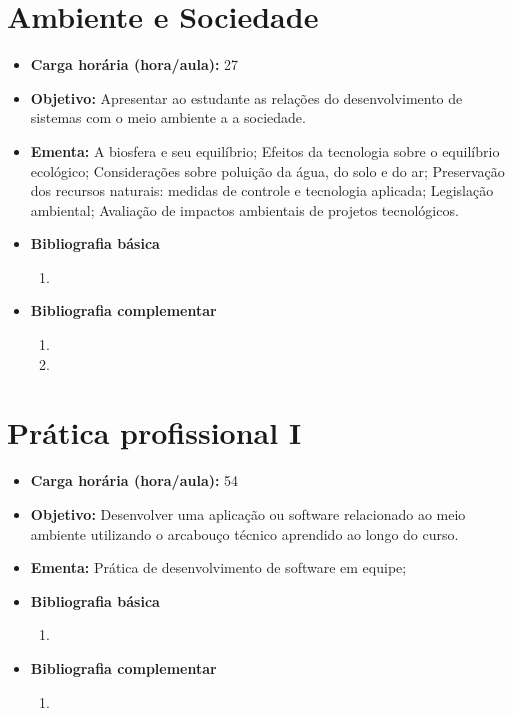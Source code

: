 \documentclass[
	10pt,				%
	openright,			%
	twoside,			%
	a4paper,			%
	english,			%
	french,				%
	brazil,				%
	sumario=tradicional
]{abntex2}
\begin{document}
\section*{Ambiente e Sociedade}\label{3_educamb}
\begin{itemize}
	\item \textbf{Carga horária (hora/aula):} 27
	\item \textbf{Objetivo:} Apresentar ao estudante as relações do desenvolvimento de sistemas com o meio ambiente a a sociedade.
	\item \textbf{Ementa:} 
	A biosfera e seu equilíbrio;
	Efeitos da tecnologia sobre o equilíbrio ecológico;
	Considerações sobre poluição da água, do solo e do ar;
	Preservação dos recursos naturais: medidas de controle e tecnologia aplicada;
	Legislação ambiental;
	Avaliação de impactos ambientais de projetos tecnológicos.
	\item \textbf{Bibliografia básica}
	\begin{enumerate}
		\item 
	\end{enumerate}
	\item \textbf{Bibliografia complementar}
	\begin{enumerate}
		\item
		\item 
	\end{enumerate}
\end{itemize}


\newpage
\section*{Prática profissional I}\label{3_projamb}
\begin{itemize}
	\item \textbf{Carga horária (hora/aula):} 54
	\item \textbf{Objetivo:} Desenvolver uma aplicação ou software relacionado ao meio ambiente utilizando o arcabouço técnico aprendido ao longo do curso.
	\item \textbf{Ementa:} 
	Prática de desenvolvimento de software em equipe;
	\item \textbf{Bibliografia básica}
	\begin{enumerate}
		\item 
	\end{enumerate}
	\item \textbf{Bibliografia complementar}
	\begin{enumerate}
		\item 	
	\end{enumerate}	
\end{itemize}
\end{document}
